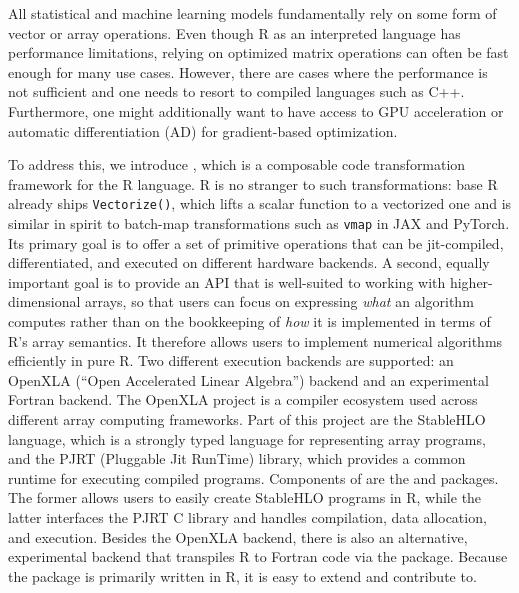 All statistical and machine learning models fundamentally rely on some form of vector or array operations.
Even though R as an interpreted language has performance limitations, relying on optimized matrix operations can often be fast enough for many use cases.
However, there are cases where the performance is not sufficient and one needs to resort to compiled languages such as C++.
Furthermore, one might additionally want to have access to GPU acceleration or automatic differentiation (AD) for gradient-based optimization.

To address this, we introduce , which is a composable code transformation framework for the R language.
R is no stranger to such transformations: base R already ships \texttt{Vectorize()}, which lifts a scalar function to a vectorized one and is similar in spirit to batch-map transformations such as \texttt{vmap} in JAX and PyTorch.
Its primary goal is to offer a set of primitive operations that can be jit-compiled, differentiated, and executed on different hardware backends.
A second, equally important goal is to provide an API that is well-suited to working with higher-dimensional arrays, so that users can focus on expressing \emph{what} an algorithm computes rather than on the bookkeeping of \emph{how} it is implemented in terms of R's array semantics.
It therefore allows users to implement numerical algorithms efficiently in pure R.
Two different execution backends are supported: an OpenXLA (``Open Accelerated Linear Algebra'') backend and an experimental Fortran backend.
The OpenXLA project is a compiler ecosystem used across different array computing frameworks.
Part of this project are the StableHLO language, which is a strongly typed language for representing array programs, and the PJRT (Pluggable Jit RunTime) library, which provides a common runtime for executing compiled programs.
Components of  are the  and  packages.
The former allows users to easily create StableHLO programs in R, while the latter interfaces the PJRT C library and handles compilation, data allocation, and execution.
Besides the OpenXLA backend, there is also an alternative, experimental backend that transpiles R to Fortran code via the  package.
Because the  package is primarily written in R, it is easy to extend and contribute to.


